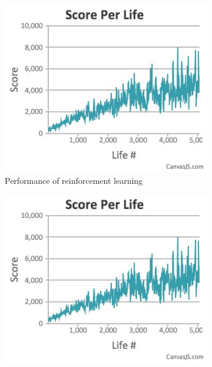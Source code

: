 \documentclass[a4paper,12pt,pagesize,headsepline,bibtotoc,titlepage,abstracton]{scrartcl}
\begin{document}
\begin{figure}
\centering
\begin{subfigure}{.5\textwidth}
  \centering
  \includegraphics[width=\linewidth]{images/performance_others}
  \caption{Performance of reinforcement learning\cite{eshohet}}
  \label{fig:perf_other}
\end{subfigure}%
\begin{subfigure}{.5\textwidth}
  \centering
  \includegraphics[width=\linewidth]{images/performance_others}
  \caption{\color{red}{TODO insert our image}}
  \label{fig:our_perf}
\end{subfigure}
\end{figure}
\end{document}
